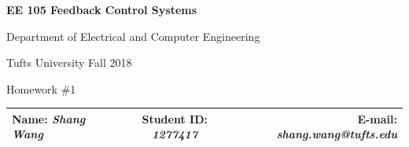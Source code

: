 \documentclass[a4paper]{article}
\begin{document}
\begin{center}
\bf\Large
EE 105 Feedback Control Systems\par
Department of Electrical and Computer Engineering\par
Tufts University Fall 2018\par
Homework \#1\par   
\end{center}
\begin{table}[H]
\begin{center}
\begin{tabular*}{\textwidth}{@{\extracolsep{\fill}}lcr}
Name: {\it Shang Wang} &Student ID: {\it 1277417} &E-mail: {\it shang.wang@tufts.edu}\\
\hline
\end{tabular*}
\end{center}
\end{table}
\end{document}
